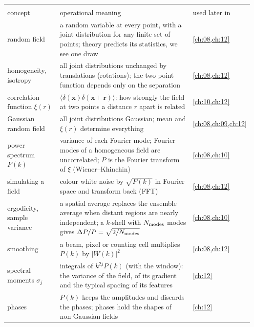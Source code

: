 \begin{center}
\small
\renewcommand{\arraystretch}{1.15}
\begin{tabularx}{\linewidth}{@{}>{\raggedright\arraybackslash}p{3.3cm}
                               >{\raggedright\arraybackslash}X
                               >{\raggedright\arraybackslash}p{2.5cm}@{}}
\toprule
\multicolumn{3}{@{}l}{\textbf{Random fields in flat space}}\\
concept & operational meaning & used later in\\\midrule
random field & a random variable at every point, with a joint distribution for any finite set of points; theory predicts its statistics, we see one draw & \cref{ch:08,ch:12}\\
homogeneity, isotropy & all joint distributions unchanged by translations (rotations); the two-point function depends only on the separation & \cref{ch:08,ch:12}\\
correlation function $\xi(r)$ & $\langle\delta(\bm x)\delta(\bm x+\bm r)\rangle$: how strongly the field at two points a distance $r$ apart is related & \cref{ch:10,ch:12}\\
Gaussian random field & all joint distributions Gaussian; mean and $\xi(r)$ determine everything & \cref{ch:08,ch:09,ch:12}\\
power spectrum $P(k)$ & variance of each Fourier mode; Fourier modes of a homogeneous field are uncorrelated; $P$ is the Fourier transform of $\xi$ (Wiener--Khinchin) & \cref{ch:08,ch:10}\\
simulating a field & colour white noise by $\sqrt{P(k)}$ in Fourier space and transform back (FFT) & \cref{ch:08,ch:12}\\
ergodicity, sample variance & a spatial average replaces the ensemble average when distant regions are nearly independent; a $k$-shell with $N_{\rm modes}$ modes gives $\Delta P/P=\sqrt{2/N_{\rm modes}}$ & \cref{ch:08,ch:10}\\
smoothing & a beam, pixel or counting cell multiplies $P(k)$ by $|W(k)|^2$ & \cref{ch:08,ch:12}\\
spectral moments $\sigma_j$ & integrals of $k^{2j}P(k)$ (with the window): the variance of the field, of its gradient and the typical spacing of its features & \cref{ch:12}\\
phases & $P(k)$ keeps the amplitudes and discards the phases; phases hold the shapes of non-Gaussian fields & \cref{ch:12}\\
\bottomrule
\end{tabularx}
\end{center}

